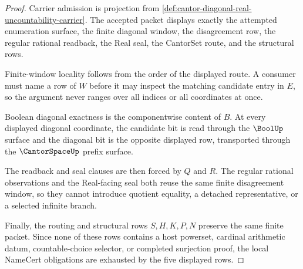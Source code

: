 \begin{proof}
Carrier admission is projection from \autoref{def:cantor-diagonal-real-uncountability-carrier}. The accepted packet displays exactly the attempted enumeration surface, the finite diagonal window, the disagreement row, the regular rational readback, the Real seal, the CantorSet route, and the structural rows.

Finite-window locality follows from the order of the displayed route. A consumer must name a row of $W$ before it may inspect the matching candidate entry in $E$, so the argument never ranges over all indices or all coordinates at once.

Boolean diagonal exactness is the componentwise content of $B$. At every displayed diagonal coordinate, the candidate bit is read through the $\BoolUp$ surface and the diagonal bit is the opposite displayed row, transported through the $\CantorSpaceUp$ prefix surface.

The readback and seal clauses are then forced by $Q$ and $R$. The regular rational observations and the Real-facing seal both reuse the same finite disagreement window, so they cannot introduce quotient equality, a detached representative, or a selected infinite branch.

Finally, the routing and structural rows $S,H,K,P,N$ preserve the same finite packet. Since none of these rows contains a host powerset, cardinal arithmetic datum, countable-choice selector, or completed surjection proof, the local NameCert obligations are exhausted by the five displayed rows.
\end{proof}

